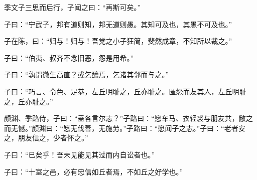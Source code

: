 \documentclass[12pt,a4paper]{ctexbook}
\begin{document}
季文子三思而后行，子闻之曰：“再斯可矣。”\par
子曰：“宁武子，邦有道则知，邦无道则愚。其知可及也，其愚不可及也。”\par
子在陈，曰：“归与！归与！吾党之小子狂简，斐然成章，不知所以裁之。”\par
子曰：“伯夷、叔齐不念旧恶，怨是用希。”\par
子曰：“孰谓微生高直？或乞醯焉，乞诸其邻而与之。”\par
子曰：“巧言、令色、足恭，左丘明耻之，丘亦耻之。匿怨而友其人，左丘明耻之，丘亦耻之。”\par
颜渊、季路侍，子曰：“盍各言尔志？”子路曰：“愿车马、衣轻裘与朋友共，敝之而无憾。”颜渊曰：“愿无伐善，无施劳。”子路曰：“愿闻子之志。”子曰：“老者安之，朋友信之，少者怀之。”\par
子曰：“已矣乎！吾未见能见其过而内自讼者也。”\par
子曰：“十室之邑，必有忠信如丘者焉，不如丘之好学也。”\par
\end{document}

